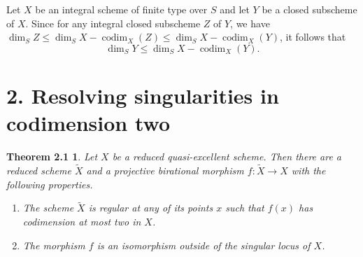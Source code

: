 \documentclass[11pt]{article}
\newcommand{\codim}{\operatorname{codim}}
\newtheorem*{mainthm}{Theorem 2.1}
\begin{document}
Let $X$ be an integral scheme of finite type over $S$ and let $Y$ be a closed subscheme of $X$. Since for any integral closed subscheme $Z$ of $Y$, we have $\dim_SZ\leq\dim_SX-\codim_X(Z)\leq\dim_SX-\codim_X(Y)$, it follows that
\begin{equation}
\dim_SY\leq\dim_SX-\codim_X(Y).\tag{1}
\end{equation}

\section*{2. Resolving singularities in codimension two}
\begin{mainthm}
Let $X$ be a reduced quasi-excellent scheme. Then there are a reduced scheme $\widetilde X$ and a projective birational morphism $f:\widetilde X\to X$ with the following properties.
\begin{enumerate}
\item[(i)] The scheme $\widetilde X$ is regular at any of its points $x$ such that $f(x)$ has codimension at most two in $X$.
\item[(ii)] The morphism $f$ is an isomorphism outside of the singular locus of $X$.
\end{enumerate}
\end{mainthm}
\end{document}
